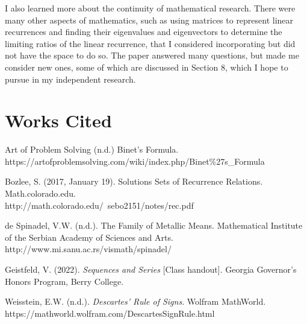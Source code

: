 \documentclass[11pt]{article}
\begin{document}
I also learned more about the continuity of mathematical research. There were many other aspects of mathematics, such as using matrices to represent linear recurrences and finding their eigenvalues and eigenvectors to determine the limiting ratios of the linear recurrence, that I considered incorporating but did not have the space to do so. The paper answered many questions, but made me consider new ones, some of which are discussed in Section 8, which I hope to pursue in my independent research.

\newpage 

\section{Works Cited}

\begin{hangparas}{.25in}{1}
    Art of Problem Solving (n.d.) Binet's Formula. \\ https://artofproblemsolving.com/wiki/index.php/Binet\%27s\_Formula

    Bozlee, S. (2017, January 19). Solutions Sets of Recurrence Relations. Math.colorado.edu. \\ http://math.colorado.edu/~sebo2151/notes/rec.pdf

    de Spinadel, V.W. (n.d.). The Family of Metallic Means. Mathematical Institute of the Serbian Academy of Sciences and Arts. \\ http://www.mi.sanu.ac.rs/vismath/spinadel/

    Geistfeld, V. (2022). \emph{Sequences and Series} [Class handout]. Georgia Governor's Honors Program, Berry College.
    
    Weisstein, E.W. (n.d.). \emph{Descartes' Rule of Signs}. Wolfram MathWorld. \\ https://mathworld.wolfram.com/DescartesSignRule.html
\end{hangparas}
\end{document}
